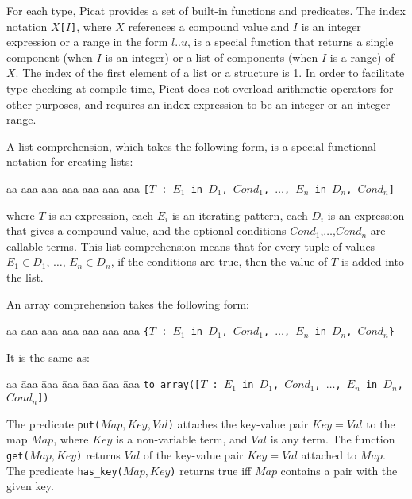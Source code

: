 For each type, Picat provides a set of built-in functions and predicates. The index notation \texttt{$X$[$I$]}, where $X$ references a compound value and $I$ is an integer expression or a range in the form $l..u$, is a special function that returns a single component (when $I$ is an integer) or a list of components (when $I$ is a range) of $X$. The index of the first element of a list or a structure is 1. In order to facilitate type checking at compile time, Picat does not overload arithmetic operators for other purposes, and requires an index expression to be an integer or an integer range.

A list comprehension, which takes the following form, is a special functional notation for creating lists:
\begin{tabbing}
aa \= aaa \= aaa \= aaa \= aaa \= aaa \= aaa \kill
\> \> \texttt{[$T$ : $E_1$ \texttt{in} $D_1$, $Cond_1$, $\ldots$, $E_n$ in $D_n$, $Cond_n$]} 
\end{tabbing}
where $T$ is an expression, each $E_i$ is an iterating pattern, each $D_i$ is an expression that gives a compound value, and the optional conditions $Cond_1$,$\ldots$,$Cond_n$  are callable terms. This list comprehension means that for every tuple of values $E_1 \in D_1$, $\ldots$, $E_n \in D_n$, if the conditions are true, then the value of $T$ is added into the list.

An array comprehension takes the following form:
\begin{tabbing}
aa \= aaa \= aaa \= aaa \= aaa \= aaa \= aaa \kill
\> \> \texttt{\{$T$ : $E_1$ \texttt{in} $D_1$, $Cond_1$, $\ldots$, $E_n$ in $D_n$, $Cond_n$\}} 
\end{tabbing}
It is the same as:
\begin{tabbing}
aa \= aaa \= aaa \= aaa \= aaa \= aaa \= aaa \kill
\> \> \texttt{to\_array([$T$ : $E_1$ \texttt{in} $D_1$, $Cond_1$, $\ldots$, $E_n$ in $D_n$, $Cond_n$])} 
\end{tabbing}

The predicate \texttt{put($Map,Key,Val$)} attaches the key-value pair \texttt{$Key$$=$$Val$} to the map \texttt{$Map$}, where \texttt{$Key$} is a non-variable term, and \texttt{$Val$} is any term. The function \texttt{get($Map,Key$)} returns \texttt{$Val$} of the key-value pair \texttt{$Key$$=$$Val$} attached to \texttt{$Map$}. The predicate \texttt{has\_key($Map,Key$)} returns true iff $Map$ contains a pair with the given key.

